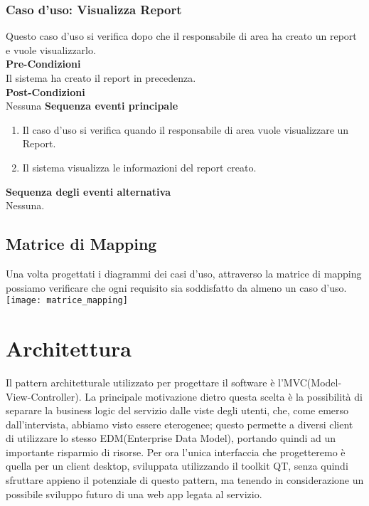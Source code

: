 \documentclass[green, fancy, 11pt]{elegantbook}
\begin{document}
\subsubsection{Caso d'uso: Visualizza Report}
\noindent
Questo caso d'uso si verifica dopo che il responsabile di area ha creato un report e vuole visualizzarlo.\\
\textbf{Pre-Condizioni}\\
Il sistema ha creato il report in precedenza.\\
\textbf{Post-Condizioni}\\
Nessuna
\textbf{Sequenza eventi principale}
\begin{enumerate}
	\item Il caso d'uso si verifica quando il responsabile di area vuole visualizzare un Report.
	\item Il sistema visualizza le informazioni del report creato.
\end{enumerate}
\textbf{Sequenza degli eventi alternativa}\\
Nessuna.
\newpage

{
\begin{landscape}
\subsection{Matrice di Mapping}
Una volta progettati i diagrammi dei casi d'uso, attraverso la matrice di mapping possiamo verificare che ogni requisito sia soddisfatto da almeno un caso d'uso.
\scriptsize
\noindent \texttt{[image: matrice\_mapping]}
\end{landscape}
}

\section{Architettura}
\noindent
Il pattern architetturale utilizzato per progettare il software è l'MVC(Model-View-Controller). La principale motivazione dietro questa scelta è la possibilità di separare la business logic del servizio dalle viste degli utenti, che, come emerso dall'intervista, abbiamo visto essere eterogenee; questo permette a diversi client di utilizzare lo stesso EDM(Enterprise Data Model), portando quindi ad un importante risparmio
di risorse. Per ora l'unica interfaccia che progetteremo è quella per un client desktop, sviluppata utilizzando il toolkit QT, senza quindi sfruttare appieno il potenziale di questo pattern, ma tenendo in considerazione un possibile sviluppo futuro di una web app legata al servizio.
\end{document}
